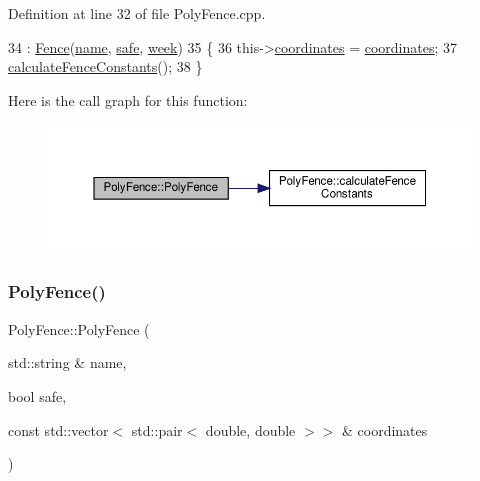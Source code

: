 Definition at line 32 of file Poly\+Fence.\+cpp.


\begin{DoxyCode}
34         : \hyperlink{class_fence_a5c2be718e885ed9ae2ca048406d126b3}{Fence}(\hyperlink{class_fence_aa405676733f25812b38ea0dd9ccd1863}{name}, \hyperlink{class_fence_ad570430040eee657c625a67d5589c4b5}{safe}, \hyperlink{class_fence_ae589e973fa03316847aeceedd72e2b64}{week})
35 \{
36     this->\hyperlink{class_poly_fence_ae8e0c55e745979cab104ef80aeb4b418}{coordinates} = \hyperlink{class_poly_fence_ae8e0c55e745979cab104ef80aeb4b418}{coordinates};
37     \hyperlink{class_poly_fence_a229de6f5987bf7d312310b522db0d5a4}{calculateFenceConstants}();
38 \}
\end{DoxyCode}
Here is the call graph for this function\+:
\nopagebreak
\begin{figure}[H]
\begin{center}
\leavevmode
\includegraphics[width=350pt]{d1/d22/class_poly_fence_a651e57a18ef757b31b5f6b54f7e081b9_cgraph}
\end{center}
\end{figure}
\mbox{\label{class_poly_fence_a8468093f83237de375992d099727b93d}} 
\subsubsection{\texorpdfstring{Poly\+Fence()}{PolyFence()}\hspace{0.1cm}{\footnotesize\ttfamily [2/3]}}
{\footnotesize\ttfamily Poly\+Fence\+::\+Poly\+Fence (\begin{DoxyParamCaption}\item[{std\+::string \&}]{name,  }\item[{bool}]{safe,  }\item[{const std\+::vector$<$ std\+::pair$<$ double, double $>$$>$ \&}]{coordinates }\end{DoxyParamCaption})}



